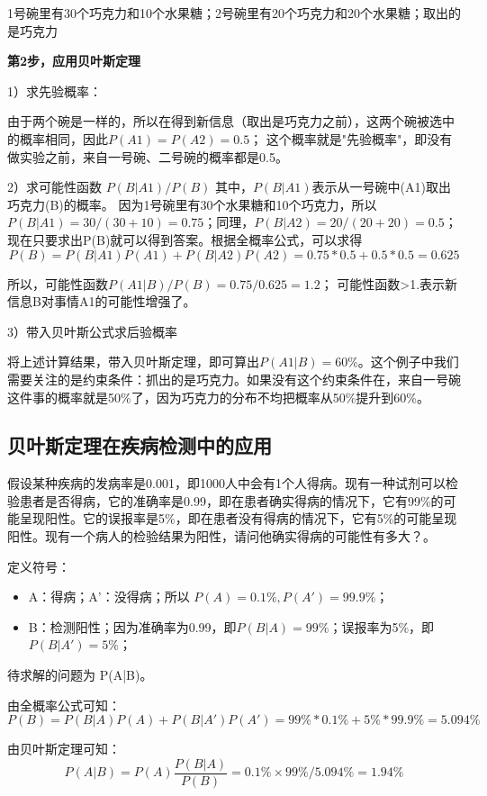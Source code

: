 \documentclass[12pt]{article}
\begin{document}
1号碗里有30个巧克力和10个水果糖；2号碗里有20个巧克力和20个水果糖；取出的是巧克力

\textbf{第2步，应用贝叶斯定理}

1）求先验概率：

由于两个碗是一样的，所以在得到新信息（取出是巧克力之前），这两个碗被选中的概率相同，因此$P(A1)=P(A2)=0.5$；
这个概率就是"先验概率"，即没有做实验之前，来自一号碗、二号碗的概率都是0.5。


2）求可能性函数 $P(B|A1)/P(B)$
其中，$P(B|A1)$表示从一号碗中(A1)取出巧克力(B)的概率。
因为1号碗里有30个水果糖和10个巧克力，所以$P(B|A1)=30/(30+10)=0.75$；同理，$P(B|A2) = 20/(20+20) = 0.5$；
现在只要求出P(B)就可以得到答案。根据全概率公式，可以求得
$$
P(B) = P(B|A1)P(A1) + P(B|A2)P(A2) = 0.75*0.5 + 0.5*0.5 = 0.625
$$

所以，可能性函数$P(A1|B)/P(B)=0.75/0.625=1.2$；
可能性函数>1.表示新信息B对事情A1的可能性增强了。

3）带入贝叶斯公式求后验概率

将上述计算结果，带入贝叶斯定理，即可算出$P(A1|B)=60\%$。这个例子中我们需要关注的是约束条件：抓出的是巧克力。如果没有这个约束条件在，来自一号碗这件事的概率就是50\%了，因为巧克力的分布不均把概率从50\%提升到60\%。

\subsection{贝叶斯定理在疾病检测中的应用}
假设某种疾病的发病率是0.001，即1000人中会有1个人得病。现有一种试剂可以检验患者是否得病，它的准确率是0.99，即在患者确实得病的情况下，它有99\%的可能呈现阳性。它的误报率是5\%，即在患者没有得病的情况下，它有5\%的可能呈现阳性。现有一个病人的检验结果为阳性，请问他确实得病的可能性有多大？。

定义符号：
\begin{itemize}
\setlength{\itemsep}{0pt}
\setlength{\parsep}{0pt}
\setlength{\parskip}{0pt}
    \item A：得病；A'：没得病；所以 $P(A) = 0.1\%, P(A') = 99.9\%$；
    \item B：检测阳性；因为准确率为0.99，即$P(B|A) = 99\%$；误报率为5\%，即$P(B|A') = 5\%$；
\end{itemize}

待求解的问题为 P(A|B)。

由全概率公式可知：
$$
P(B) = P(B|A)P(A) + P(B|A')P(A') = 99\%*0.1\% + 5\%*99.9\% = 5.094\%
$$

由贝叶斯定理可知：
$$
P(A|B) = P(A)\frac{P(B|A)}{P(B)} = 0.1\% \times 99\% / 5.094\% = 1.94\%
$$
\end{document}
